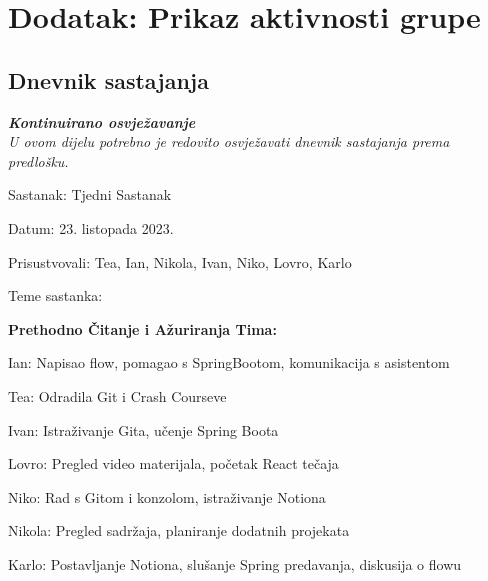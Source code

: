 \chapter*{Dodatak: Prikaz aktivnosti grupe}
		
		\section*{Dnevnik sastajanja}
		
		\textbf{\textit{Kontinuirano osvježavanje}}\\
		
		 \textit{U ovom dijelu potrebno je redovito osvježavati dnevnik sastajanja prema predlošku.}
		
		\begin{packed_enum}
        \item Sastanak: Tjedni Sastanak
            \item[] \begin{packed_item}
                \item Datum: 23. listopada 2023.
                \item Prisustvovali: Tea, Ian, Nikola, Ivan, Niko, Lovro, Karlo
                \item Teme sastanka:
                    \begin{packed_item}
                        \item \textbf{Prethodno Čitanje i Ažuriranja Tima:}
                            \begin{packed_item}
                                \item Ian: Napisao flow, pomagao s SpringBootom, komunikacija s asistentom
                                \item Tea: Odradila Git i Crash Courseve
                                \item Ivan: Istraživanje Gita, učenje Spring Boota
                                \item Lovro: Pregled video materijala, početak React tečaja
                                \item Niko: Rad s Gitom i konzolom, istraživanje Notiona
                                \item Nikola: Pregled sadržaja, planiranje dodatnih projekata
                                \item Karlo: Postavljanje Notiona, slušanje Spring predavanja, diskusija o flowu
                            \end{packed_item}

\end{packed_item}
\end{packed_item}
\end{packed_enum}
